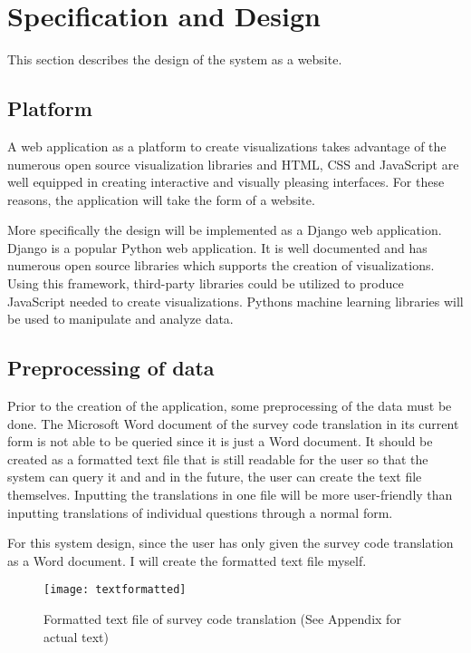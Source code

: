 \chapter{Specification and Design} \label{ch:design}

This section describes the design of the system as a website.

\section{Platform}
A web application as a platform to create visualizations takes advantage of the numerous open source visualization libraries and HTML, CSS and JavaScript are well equipped in creating interactive and visually pleasing interfaces. For these reasons, the application will take the form of a website.\par

More specifically the design will be implemented as a Django \cite{django} web application. Django is a popular Python web application. It is well documented and has numerous open source libraries which supports the creation of visualizations. Using this framework, third-party libraries could be utilized to produce JavaScript needed to create visualizations. Python\textquotesingle s machine learning libraries will be used to manipulate and analyze data.

\section{Preprocessing of data} \label{preprocessing}
Prior to the creation of the application, some preprocessing of the data must be done. The Microsoft Word document of the survey code translation in its current form is not able to be queried since it is just a Word document. It should be created as a formatted text file that is still readable for the user so that the system can query it and and in the future, the user can create the text file themselves. Inputting the translations in one file will be more user-friendly than inputting translations of individual questions through a normal form.\par

For this system design, since the user has only given the survey code translation as a Word document. I will create the formatted text file myself.\par


\begin{figure}[h]
\centering
\texttt{[image: textformatted]}
\caption{Formatted text file of survey code translation (See Appendix for actual text)}
\end{figure}

